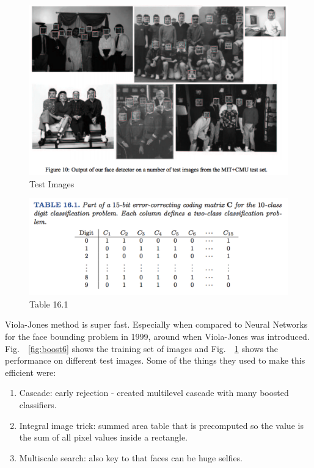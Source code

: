 \documentclass[a4paper]{article}
\begin{document}
\begin{figure}
\centering
\includegraphics[width=1.0\textwidth]{fig10.png}
\caption{\label{fig:boost7}Test Images}
\end{figure}

\begin{figure}
\centering
\includegraphics[width=1.0\textwidth]{table16_1.png}
\caption{\label{fig:boost8}Table 16.1}
\end{figure}

Viola-Jones method is super fast. Especially when compared to Neural Networks for the face bounding problem in 1999, around when Viola-Jones was introduced. Fig.\ ~\ref{fig:boost6} shows the training set of images and Fig.\ ~\ref{fig:boost7} shows the performance on different test images. Some of the things they used to make this efficient were:

\begin{enumerate}
\item Cascade: early rejection - created multilevel cascade with many boosted classifiers.
\item Integral image trick: summed area table that is precomputed so the value is the sum of all pixel values inside a rectangle.
\item Multiscale search: also key to that faces can be huge selfies.
\end{enumerate}
\end{document}
